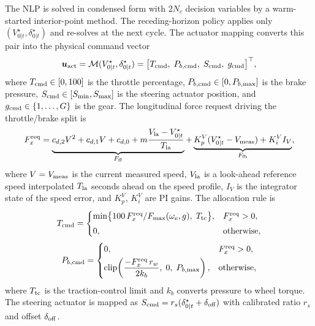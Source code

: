 \documentclass{iopjournal}
\begin{document}
The NLP is solved in condensed form with $2N_c$ decision variables by a
warm-started interior-point method.  The receding-horizon policy applies
only $(V_{0|t}^\star,\delta_{0|t}^\star)$ and re-solves at the next cycle.
The actuator mapping converts this pair into the physical command vector
\begin{equation}
\bm{u}_{\rm act}=
\mathcal{M}(V_{0|t}^\star,\delta_{0|t}^\star)
=\bigl[T_{\rm cmd},\;P_{b,\rm cmd},\;S_{\rm cmd},\;g_{\rm cmd}\bigr]^\top,
\label{eq:actuator_map}
\end{equation}
where $T_{\rm cmd}\in[0,100]$ is the throttle percentage,
$P_{b,\rm cmd}\in[0,P_{b,\max}]$ is the brake pressure,
$S_{\rm cmd}\in[S_{\min},S_{\max}]$ is the steering actuator position, and
$g_{\rm cmd}\in\{1,\ldots,G\}$ is the gear.  The longitudinal force
request driving the throttle/brake split is
\begin{equation}
F_x^{\rm req}=
\underbrace{c_{d,2}V^2+c_{d,1}V+c_{d,0}
+m\frac{V_{\rm la}-V_{0|t}^\star}{T_{\rm la}}}_{F_{\rm ff}}
+\underbrace{K_p^V(V_{0|t}^\star-V_{\rm meas})
+K_i^V I_V}_{F_{\rm fb}},
\label{eq:force_req}
\end{equation}
where $V=V_{\rm meas}$ is the current measured speed,
$V_{\rm la}$ is a look-ahead reference speed interpolated $T_{\rm la}$
seconds ahead on the speed profile, $I_V$ is the integrator state of the
speed error, and $K_p^V$, $K_i^V$ are PI gains.
The allocation rule is
\begin{equation}
T_{\rm cmd}=
\begin{cases}
\min\bigl\{100\,F_x^{\rm req}/F_{\max}(\omega_e,g),\;
T_{\rm tc}\bigr\},
& F_x^{\rm req}>0,\\[3pt]
0, & \text{otherwise},
\end{cases}
\label{eq:throttle_map}
\end{equation}
\begin{equation}
P_{b,\rm cmd}=
\begin{cases}
0, & F_x^{\rm req}>0,\\[3pt]
\mathrm{clip}\!\left(
\dfrac{-F_x^{\rm req}\,r_w}{2k_b},\;0,\;P_{b,\max}\right),
& \text{otherwise},
\end{cases}
\label{eq:brake_map}
\end{equation}
where $T_{\rm tc}$ is the traction-control limit and $k_b$ converts
pressure to wheel torque.  The steering actuator is mapped as
$S_{\rm cmd}=r_s(\delta_{0|t}^\star+\delta_{\rm off})$
with calibrated ratio $r_s$ and offset $\delta_{\rm off}$.


\end{document}
